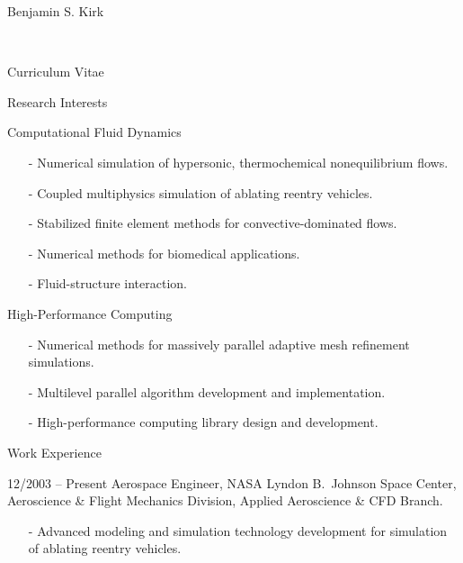 \documentclass[10pt]{report}
\begin{document}
\begin{cv}{\centerline{\Large Benjamin S. Kirk}\\
    \centerline{\large Curriculum Vitae}}
  \vspace{-.5em}
  \begin{cvlist}{Research Interests}
    \item[Computational Fluid Dynamics] \mbox{ }
      \begin{itemize}
        \item[-] Numerical simulation of hypersonic, thermochemical nonequilibrium flows.
        \item[-] Coupled multiphysics simulation of ablating reentry vehicles.
        \item[-] Stabilized finite element methods for convective-dominated flows.
        \item[-] Numerical methods for biomedical applications.
        \item[-] Fluid-structure interaction.
      \end{itemize}
    \item[High-Performance Computing] \mbox{ }
      \begin{itemize}
        \item[-] Numerical methods for massively parallel adaptive mesh refinement simulations.
        \item[-] Multilevel parallel algorithm development and implementation.
        \item[-] High-performance computing library design and development.
      \end{itemize}
  \end{cvlist}
  
  \vspace{-.5em}
  \begin{cvlist}{Work Experience}
    \item[12/2003 -- Present]
      Aerospace Engineer, NASA Lyndon B.\ Johnson Space Center, Aeroscience \& Flight Mechanics Division, Applied Aeroscience \& CFD Branch.
      \begin{itemize}
        \item[-]
          Advanced modeling and simulation technology development for simulation of ablating reentry vehicles.


\end{itemize}
\end{cvlist}
\end{cv}
\end{document}
